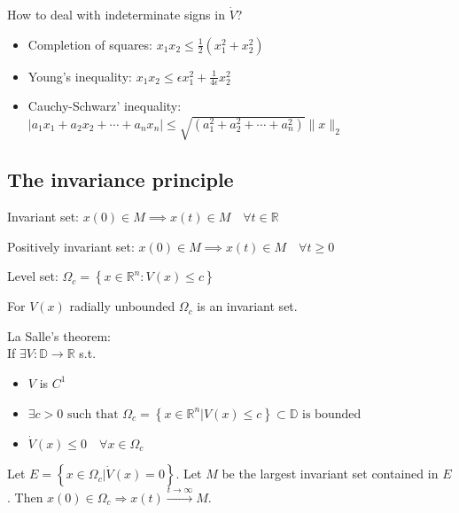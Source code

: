 \begin{remark}
    How to deal with indeterminate signs in $\dot{V}$?
    \begin{itemize}[topsep=0pt]
        \item Completion of squares: $x_1 x_2 \leq \frac{1}{2}(x_1^2 + x_2^2)$
        \item Young's inequality: $x_1 x_2 \leq \epsilon x_1^2 + \frac{1}{4\epsilon}x_2^2$
        \item Cauchy-Schwarz' inequality: $\left|a_{1} x_{1}+a_{2} x_{2}+\cdots+a_{n} x_{n}\right| \leq \sqrt{\left(a_{1}^{2}+a_{2}^{2}+\cdots+a_{n}^{2}\right)}\|x\|_{2}$
    \end{itemize}
\end{remark}

\subsection{The invariance principle}
\begin{definition}
    Invariant set: $x(0) \in M \implies x(t) \in M \quad \forall t \in \mathbb{R}$
\end{definition}

\begin{definition}
    Positively invariant set: $x(0) \in M \implies x(t) \in M \quad \forall t \geq 0$
\end{definition}

\begin{definition}
    Level set: $\Omega_{c}=\left\{x \in \mathbb{R}^{n}: V(x) \leq c\right\}$
\end{definition}

\begin{remark}
    For $V(x)$ radially unbounded $\Omega_c$ is an invariant set.
\end{remark}

\begin{tcolorbox}[colback=white, colframe=teal]
\begin{theorem}
    La Salle's theorem:\\
    If $\exists V : \mathbb{D} \rightarrow \mathbb{R}$ s.t.
    \begin{itemize}[topsep=0pt]
        \item $V$ is $C^1$
        \item $\exists c>0 \text { such that } \Omega_{c}=\left\{x \in \mathbb{R}^{n} | V(x) \leq c\right\} \subset \mathbb{D} \text { is bounded }$
        \item $\dot{V}(x) \leq 0 \quad \forall x \in \Omega_{c}$
    \end{itemize}
    Let $E=\left\{x \in \Omega_{c} | \dot{V}(x)=0\right\}$. Let $M$ be the largest invariant set contained in $E$.
    Then $x(0) \in \Omega_{c} \Rightarrow x(t) \stackrel{t \rightarrow \infty}{\longrightarrow} M$.
\end{theorem}
\end{tcolorbox}

